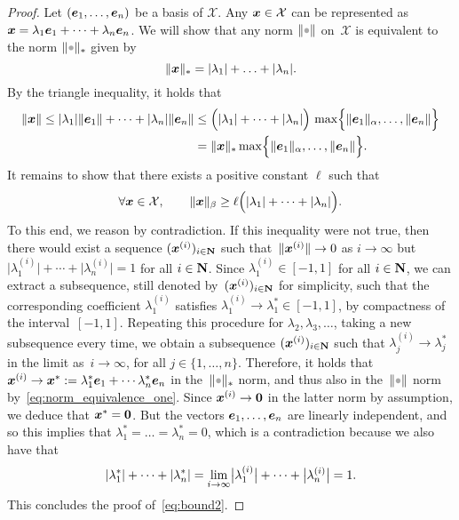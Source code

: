 \begin{proof}
    Let $(\mathbf{\boldsymbol{e}}_1, \dotsc, \mathbf{\boldsymbol{e}}_n)$ be a basis of $\mathcal X$.
    Any $\mathbf{\boldsymbol{x}} \in \mathcal X$ can be represented as $\mathbf{\boldsymbol{x}} = \lambda_1 \mathbf{\boldsymbol{e}}_1 + \dotsb + \lambda_n \mathbf{\boldsymbol{e}}_n$.
    We will show that any norm $\norm{\placeholder}$ on~$\mathcal X$ is equivalent to the norm $\norm{\placeholder}_*$ given by
    \[
        \lVert\mathbf{\boldsymbol{x}}\rVert_* = \lvert\lambda_1\rvert + \dotsc + \lvert\lambda_n\rvert.
    \]
    By the triangle inequality,
    it holds that
    \begin{align}
        \nonumber
        \lVert\mathbf{\boldsymbol{x}}\rVert \leq \lvert\lambda_1\rvert \lVert\mathbf{\boldsymbol{e}}_1\rVert + \dotsb + \lvert\lambda_n\rvert \lVert\mathbf{\boldsymbol{e}}_n\rVert 
        &\leq \Bigl(\lvert\lambda_1\rvert + \dotsb + \lvert\lambda_n\rvert\Bigr) \, 
        \max \Bigl\{\lVert\mathbf{\boldsymbol{e}}_1\rVert_{\alpha}, \dotsc, \lVert\mathbf{\boldsymbol{e}}_n\rVert\Bigr\} \\
        \label{eq:norm_equivalence_one}
        &= \lVert\mathbf{\boldsymbol{x}}\rVert_* \max \Bigl\{\lVert\mathbf{\boldsymbol{e}}_1\rVert_{\alpha}, \dotsc, \lVert\mathbf{\boldsymbol{e}}_n\rVert\Bigr\}.
    \end{align}
    It remains to show that
    there exists a positive constant $\ell$ such that
    \begin{equation}
        \label{eq:bound2}
        \forall \mathbf{\boldsymbol{x}} \in \mathcal X, \qquad
        \lVert\mathbf{\boldsymbol{x}}\rVert_{\beta}
        \geq \ell \Bigl( \lvert\lambda_1\rvert + \dotsb + \lvert\lambda_n\rvert \Bigr).
    \end{equation}
    To this end, we reason by contradiction.
    If this inequality were not true,
    then there would exist a sequence $(\mathbf{\boldsymbol{x}}^{(i)})_{i \in \mathbf N}$ such
    that~$\lVert\mathbf{\boldsymbol{x}}^{(i)}\rVert \to 0$ as $i \to \infty$ but $\bigl\lvert \lambda_1^{(i)} \bigr\rvert + \dotsb + \bigl\lvert \lambda_n^{(i)} \bigr\rvert = 1$ for all $i \in \mathbf N$.
    Since $\lambda_1^{(i)} \in [-1, 1]$ for all $i \in \mathbf N$,
    we can extract a subsequence, still denoted by~$(\mathbf{\boldsymbol{x}}^{(i)})_{i \in \mathbf N}$ for simplicity,
    such that the corresponding coefficient $\lambda_1^{(i)}$ satisfies $\lambda_1^{(i)} \to \lambda_1^* \in [-1, 1]$,
    by compactness of the interval~$[-1, 1]$.
    Repeating this procedure for $\lambda_2, \lambda_3, \dots$,
    taking a new subsequence every time,
    we obtain a subsequence $(\mathbf{\boldsymbol{x}}^{(i)})_{i \in \mathbf N}$ such that $\lambda^{(i)}_j \to \lambda_j^*$ in the limit as~$i \to \infty$, for all $j \in \{1, \dotsc, n\}$.
    Therefore, it holds that $\mathbf{\boldsymbol{x}}^{(i)} \to \mathbf{\boldsymbol{x}}^* := \lambda_1^* \mathbf{\boldsymbol{e}}_1 + \dotsb \lambda_n^* \mathbf{\boldsymbol{e}}_n$ in the~$\norm{\placeholder}_*$ norm,
    and thus also in the~$\norm{\placeholder}$ norm by~\eqref{eq:norm_equivalence_one}.
    Since $\mathbf{\boldsymbol{x}}^{(i)} \to \mathbf{\boldsymbol{0}}$ in the latter norm by assumption,
    we deduce that $\mathbf{\boldsymbol{x}}^* = \mathbf{\boldsymbol{0}}$.
    But the vectors $\mathbf{\boldsymbol{e}}_1, \dotsc, \mathbf{\boldsymbol{e}}_n$ are linearly independent,
    and so this implies that $\lambda_1^* = \dots = \lambda_n^* = 0$,
    which is a contradiction because we also have that
    \[
        \lvert\lambda_1^*\rvert + \dotsb + \lvert\lambda_n^*\rvert
        = \lim_{i \to \infty} \bigl\lvert \lambda_1^{(i)} \bigr\rvert + \dotsb + \bigl\lvert \lambda_n^{(i)} \bigr\rvert = 1.
    \]
    This concludes the proof of~\eqref{eq:bound2}.
\end{proof}


